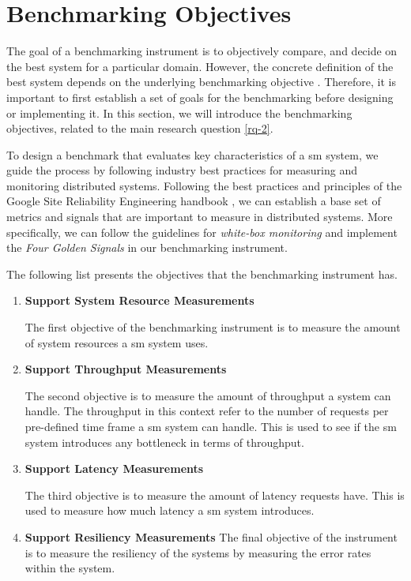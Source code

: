 \section{Benchmarking Objectives}
\label{sec:system:objectives}


The goal of a benchmarking instrument is to objectively compare, and decide on the best system for a particular domain. However, the concrete definition of the best system depends on the underlying benchmarking objective \cite{folkerts2012benchmarking}. Therefore, it is important to first establish a set of goals for the benchmarking before designing or implementing it. In this section, we will introduce the benchmarking objectives, related to the main research question \ref{rq-2}.

To design a benchmark that evaluates key characteristics of a \gls{sm} system, we guide the process by following industry best practices for measuring and monitoring distributed systems. Following the best practices and principles of the Google Site Reliability Engineering handbook \cite{beyer2016}, we can establish a base set of metrics and signals that are important to measure in distributed systems. More specifically, we can follow the guidelines for \textit{white-box monitoring} and implement the  \textit{Four Golden Signals} in our benchmarking instrument.

The following list presents the objectives that the benchmarking instrument has.

\begin{enumerate}[label=\textbf{O\arabic*}, leftmargin=3\parindent]
    \item \textbf{Support System Resource Measurements}
    \label{o-1}
    
    The first objective of the benchmarking instrument is to measure the amount of system resources a \gls{sm} system uses.
    
    \item \textbf{Support Throughput Measurements}
    \label{o-2}
    
    The second objective is to measure the amount of throughput a system can handle. The throughput in this context refer to the number of requests per pre-defined time frame a \gls{sm} system can handle. This is used to see if the \gls{sm} system introduces any bottleneck in terms of throughput.

    \item \textbf{Support Latency Measurements}
    \label{o-3}
    
    The third objective is to measure the amount of latency requests have. This is used to measure how much latency a \gls{sm} system introduces.

    \item \textbf{Support Resiliency Measurements}
    \label{o-4}
    The final objective of the instrument is to measure the resiliency of the systems by measuring the error rates within the system.
    
\end{enumerate}
